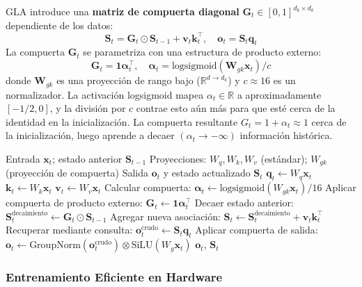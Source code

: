\documentclass[11pt,a4paper]{article}
\begin{document}
GLA introduce una \textbf{matriz de compuerta diagonal} $\mathbf{G}_t \in [0,1]^{d_k \times d_k}$ dependiente de los datos:
\[
\mathbf{S}_t = \mathbf{G}_t \odot \mathbf{S}_{t-1} + \mathbf{v}_t \mathbf{k}_t^\top, \quad \mathbf{o}_t = \mathbf{S}_t \mathbf{q}_t
\]
La compuerta $\mathbf{G}_t$ se parametriza con una estructura de producto externo:
\[
\mathbf{G}_t = \mathbf{1} \boldsymbol{\alpha}_t^\top, \quad \boldsymbol{\alpha}_t = \text{logsigmoid}\left(\mathbf{W}_{gk} \mathbf{x}_t\right) / c
\]
donde $\mathbf{W}_{gk}$ es una proyección de rango bajo ($\mathbb{R}^{d \to d_k}$) y $c \approx 16$ es un normalizador. La activación logsigmoid mapea $\alpha_t \in \mathbb{R}$ a aproximadamente $[-1/2, 0]$, y la división por $c$ contrae esto aún más para que esté cerca de la identidad en la inicialización. La compuerta resultante $G_t = 1 + \alpha_t \approx 1$ cerca de la inicialización, luego aprende a decaer $(\alpha_t \to -\infty)$ información histórica.

\begin{algorithm}[H]
\caption{Atención Lineal con Compuerta (Forma Recurrente)}
\begin{algorithmic}[1]
\Require Entrada $\mathbf{x}_t$; estado anterior $\mathbf{S}_{t-1}$
\Require Proyecciones: $W_q, W_k, W_v$ (estándar); $W_{gk}$ (proyección de compuerta)
\Ensure Salida $\mathbf{o}_t$ y estado actualizado $\mathbf{S}_t$
\State $\mathbf{q}_t \gets W_q \mathbf{x}_t$
\State $\mathbf{k}_t \gets W_k \mathbf{x}_t$
\State $\mathbf{v}_t \gets W_v \mathbf{x}_t$
\State Calcular compuerta: $\boldsymbol{\alpha}_t \gets \text{logsigmoid}(W_{gk} \mathbf{x}_t) / 16$ 
\State Aplicar compuerta de producto externo: $\mathbf{G}_t \gets \mathbf{1} \boldsymbol{\alpha}_t^\top$  
\State Decaer estado anterior: $\mathbf{S}_t^\text{decaimiento} \gets \mathbf{G}_t \odot \mathbf{S}_{t-1}$ 
\State Agregar nueva asociación: $\mathbf{S}_t \gets \mathbf{S}_t^\text{decaimiento} + \mathbf{v}_t \mathbf{k}_t^\top$
\State Recuperar mediante consulta: $\mathbf{o}_t^\text{crudo} \gets \mathbf{S}_t \mathbf{q}_t$
\State Aplicar compuerta de salida: $\mathbf{o}_t \gets \text{GroupNorm}(\mathbf{o}_t^\text{crudo}) \otimes \text{SiLU}(W_g \mathbf{x}_t)$
\Return $\mathbf{o}_t$, $\mathbf{S}_t$
\end{algorithmic}
\end{algorithm}

\subsubsection{Entrenamiento Eficiente en Hardware}
\end{document}

